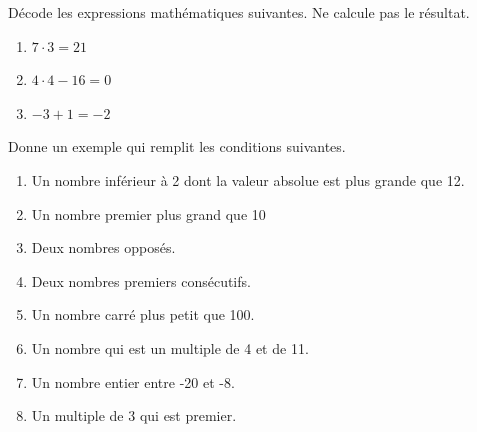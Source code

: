 \documentclass[parskip=half-,DIV=12,twoside=semi, 12pt]{scrartcl}
\begin{document}
\begin{connaitre}[points=3]
    Décode les expressions mathématiques suivantes. Ne calcule pas le résultat.
    \begin{enumerate}[itemsep=2.5cm]
        \item $7\cdot 3 = 21$
        \item $4\cdot 4 - 16=0$
        \item $-3+1=-2$
    \end{enumerate}
    \vspace{2.5cm}
\end{connaitre}
\begin{connaitre}[points=8]
    Donne un exemple qui remplit les conditions suivantes.
    \begin{enumerate}[itemsep=1cm, after=\vspace*{1cm}]
        \item Un nombre inférieur à 2 dont la valeur absolue est plus grande que 12.
        \item Un nombre premier plus grand que 10
        \item Deux nombres opposés.
        \item Deux nombres premiers consécutifs.
        \item Un nombre carré plus petit que 100.
        \item Un nombre qui est un multiple de 4 et de 11.
        \item Un nombre entier entre -20 et -8.
        \item Un multiple de 3 qui est premier.
    \end{enumerate}
\end{connaitre}
\end{document}
